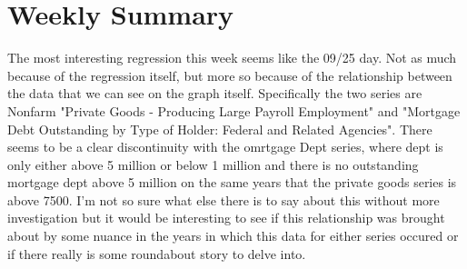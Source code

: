 \section{Weekly Summary}

The most interesting regression this week seems like the 09/25 day. Not as much because of the regression itself,
but more so because of the relationship between the data that we can see on the graph itself. Specifically the two
series are Nonfarm "Private Goods - Producing Large Payroll Employment" and "Mortgage Debt Outstanding by Type of 
Holder: Federal and Related Agencies". There seems to be a clear discontinuity with the omrtgage Dept series, where
dept is only either above 5 million or below 1 million and there is no outstanding mortgage dept above 5 million on
the same years that the private goods series is above 7500. I'm not so sure what else there is to say about this
without more investigation but it would be interesting to see if this relationship was brought about by some nuance
in the years in which this data for either series occured or if there really is some roundabout story to delve into.